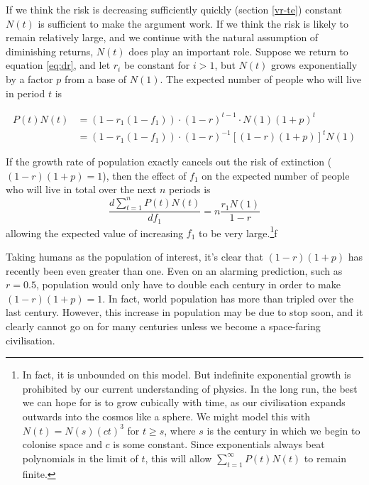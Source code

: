 \documentclass[british]{article}
\begin{document}
If we think the risk is decreasing sufficiently quickly (section \ref{vr-te}) constant $N(t)$ is sufficient to make the argument work. If we think the risk is likely to remain relatively large, and we continue with the natural assumption of diminishing returns, $N(t)$ does play an important role. Suppose we return to equation \ref{eq:dr}, and let $r_i$ be constant for $i>1$, but $N(t)$ grows exponentially by a factor $p$ from a base of $N(1)$. The expected number of people who will live in period $t$ is

\begin{equation}
\begin{split}
P(t)N(t) &= (1-r_1(1-f_1)) \cdot (1-r)^{t-1} \cdot N(1)(1+p)^t \label{eq:populationgrowth}\\
         &=  (1-r_1(1-f_1)) \cdot (1-r)^{-1}[(1-r)(1+p)]^{t} N(1)
\end{split}
\end{equation}

If the growth rate of population exactly cancels out the risk of extinction ($(1-r)(1+p) = 1$), then the effect of $f_1$ on the expected number of people who will live in total over the next $n$ periods is  
$$\frac{d\sum_{t=1}^n P(t)N(t)}{df_1} = n\frac{r_1N(1)}{1-r}$$
allowing the expected value of increasing $f_1$ to be very large.\footnote{In fact, it is unbounded on this model. But indefinite exponential growth is prohibited by our current understanding of physics. In the long run, the best we can hope for is to grow cubically with time, as our civilisation expands outwards into the cosmos like a sphere. We might model this with $N(t)=N(s)(ct)^3$ for $t\geq s$, where $s$ is the century in which we begin to colonise space and $c$ is some constant. Since exponentials always beat polynomials in the limit of $t$, this will allow $\sum_{t=1}^\infty P(t)N(t)$ to remain finite.}f

Taking humans as the population of interest, it's clear that $(1-r)(1+p)$ has recently been even greater than one. Even on an alarming prediction, such as $r=0.5$, population would only have to double each century in order to make $(1-r)(1+p)=1$. In fact, world population has more than tripled over the last century. However, this increase in population may be due to stop soon, and it clearly cannot go on for many centuries unless we become a space-faring civilisation.
\end{document}
